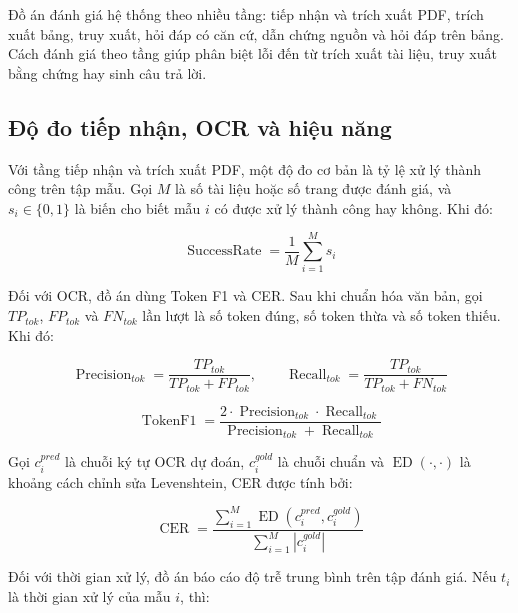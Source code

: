\documentclass[../DoAn.tex]{subfiles}
\begin{document}
Đồ án đánh giá hệ thống theo nhiều tầng: tiếp nhận và trích xuất PDF, trích xuất
bảng, truy xuất, hỏi đáp có căn cứ, dẫn chứng nguồn và hỏi đáp trên bảng. Cách
đánh giá theo tầng giúp phân biệt lỗi đến từ trích xuất tài liệu, truy xuất bằng chứng
hay sinh câu trả lời.

\subsection{Độ đo tiếp nhận, OCR và hiệu năng}

Với tầng tiếp nhận và trích xuất PDF, một độ đo cơ bản là tỷ lệ xử lý thành công trên tập mẫu. Gọi
\(M\) là số tài liệu hoặc số trang được đánh giá, và \(s_i \in \{0,1\}\) là biến
cho biết mẫu \(i\) có được xử lý thành công hay không. Khi đó:

\begin{equation}
\label{eq:success-rate}
\operatorname{SuccessRate} =
\frac{1}{M}
\sum_{i=1}^{M} s_i
\end{equation}

Đối với OCR, đồ án dùng Token F1 và CER. Sau khi chuẩn hóa văn bản, gọi
\(TP_{tok}\), \(FP_{tok}\) và \(FN_{tok}\) lần lượt là số token đúng, số token thừa
và số token thiếu. Khi đó:

\begin{equation}
\label{eq:token-precision-recall}
\operatorname{Precision}_{tok} =
\frac{TP_{tok}}{TP_{tok}+FP_{tok}},
\qquad
\operatorname{Recall}_{tok} =
\frac{TP_{tok}}{TP_{tok}+FN_{tok}}
\end{equation}

\begin{equation}
\label{eq:token-f1}
\operatorname{TokenF1} =
\frac{2 \cdot \operatorname{Precision}_{tok} \cdot \operatorname{Recall}_{tok}}
{\operatorname{Precision}_{tok}+\operatorname{Recall}_{tok}}
\end{equation}

Gọi \(c_i^{pred}\) là chuỗi ký tự OCR dự đoán, \(c_i^{gold}\) là chuỗi chuẩn và
\(\operatorname{ED}(\cdot,\cdot)\) là khoảng cách chỉnh sửa Levenshtein, CER được
tính bởi:

\begin{equation}
\label{eq:cer}
\operatorname{CER} =
\frac{\sum_{i=1}^{M} \operatorname{ED}(c_i^{pred}, c_i^{gold})}
{\sum_{i=1}^{M} |c_i^{gold}|}
\end{equation}

Đối với thời gian xử lý, đồ án báo cáo độ trễ trung bình trên tập đánh giá. Nếu
\(t_i\) là thời gian xử lý của mẫu \(i\), thì:
\end{document}
